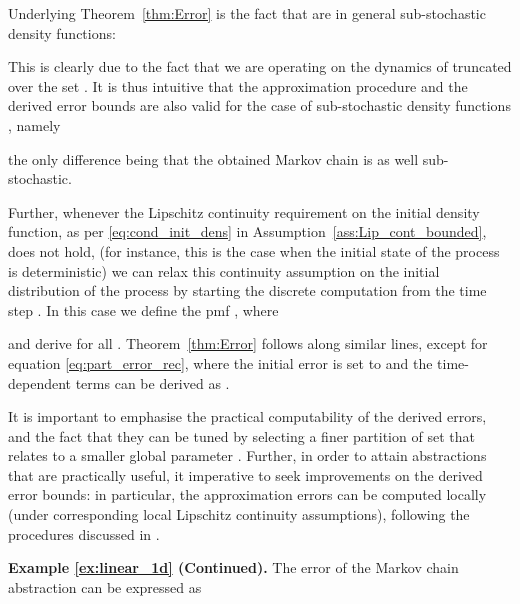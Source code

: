 \documentclass{LMCS}
\begin{document}
Underlying Theorem~\ref{thm:Error} is the fact that  are in general sub-stochastic density functions:  
 
This is clearly due to the fact that we are operating on the dynamics of  truncated over the set .  
It is thus intuitive that the approximation procedure and the derived error bounds are also valid for the case of sub-stochastic density functions \cite{AKNP14}, 
namely 

the only difference being that the obtained Markov chain  is as well sub-stochastic.  
 
Further, 
whenever the Lipschitz continuity requirement on the initial density function, as per \eqref{eq:cond_init_dens} in Assumption~\ref{ass:Lip_cont_bounded}, does not hold, 
(for instance, this is the case when the initial state of the process is deterministic)
we can relax this continuity assumption on the initial distribution of the process by starting the discrete computation from the time step . 
In this case we define the pmf ,
where

and derive  for all . 
Theorem~\ref{thm:Error} follows along similar lines, 
except for equation \eqref{eq:part_error_rec}, where the initial error is set to  
and the time-dependent terms  can be derived as 
.

It is important to emphasise the practical computability of the derived errors, 
and the fact that they can be tuned by selecting a finer partition of set  that relates to a smaller global parameter . 
Further,
in order to attain abstractions that are practically useful, it imperative to seek improvements on the derived error bounds: 
in particular, the approximation errors can be computed locally (under corresponding local Lipschitz continuity assumptions), 
following the procedures discussed in \cite{SA13}.

\medskip

\noindent\textbf{Example \ref{ex:linear_1d} (Continued).}
The error of the Markov chain abstraction can be expressed as
\end{document}
